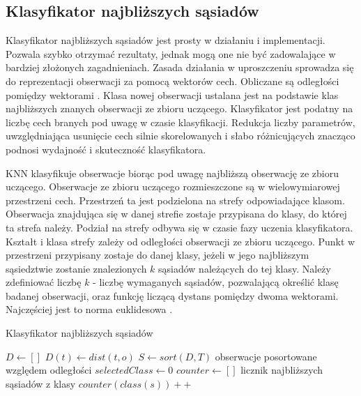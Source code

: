 \documentclass[a4paper,12pt,twoside,openany]{report}
\begin{document}
\subsection{Klasyfikator najbliższych sąsiadów}
Klasyfikator najbliższych sąsiadów jest prosty w działaniu i implementacji.
Pozwala szybko otrzymać rezultaty, jednak mogą one nie być zadowalające w bardziej złożonych zagadnieniach.
Zasada działania w uproszczeniu sprowadza się do reprezentacji obserwacji za pomocą wektorów cech.
Obliczane są odległości pomiędzy wektorami \cite{Du2013}.
Klasa nowej obserwacji ustalana jest na podstawie klas najbliższych znanych obserwacji ze zbioru uczącego.
Klasyfikator jest podatny na liczbę cech branych pod uwagę w czasie klasyfikacji.
Redukcja liczby parametrów, uwzględniająca usunięcie cech silnie skorelowanych i słabo różnicujących znacząco podnosi wydajność i skuteczność klasyfikatora.

KNN klasyfikuje obserwacje biorąc pod uwagę najbliższą obserwację ze zbioru uczącego.
Obserwacje ze zbioru uczącego rozmieszczone są w wielowymiarowej przestrzeni cech.
Przestrzeń ta jest podzielona na strefy odpowiadające klasom.
Obserwacja znajdująca się w danej strefie zostaje przypisana do klasy, do której ta strefa należy.
Podział na strefy odbywa się w czasie fazy uczenia klasyfikatora.
Kształt i klasa strefy zależy od odległości obserwacji ze zbioru uczącego.
Punkt w przestrzeni przypisany zostaje do danej klasy, jeżeli w jego najbliższym sąsiedztwie zostanie znalezionych $k$ sąsiadów należących do tej klasy.
Należy zdefiniować liczbę $k$ - liczbę wymaganych sąsiadów, pozwalającą określić klasę badanej obserwacji, 
oraz funkcję liczącą dystans pomiędzy dwoma wektorami. Najczęściej jest to norma euklidesowa \cite{Martin2011}.

\begin{algorithm}
	\caption{Klasyfikator najbliższych sąsiadów}
	\begin{algorithmic}[1]
		\State $D \leftarrow [ ]$
		\State $D(t) \leftarrow dist(t, o)$
		\EndFor
		\State $S \leftarrow sort(D, T)$ \Comment obserwacje posortowane względem odległości
		\State $selectedClass \leftarrow 0$
		\State $counter \leftarrow [ ]$ \Comment licznik najbliższych sąsiadów z klasy
		\Repeat
		\State $counter(class(s))++$
		\EndFor
		\EndProcedure
	\end{algorithmic}
	\label{alg:knn:alg}
\end{algorithm}
\end{document}
